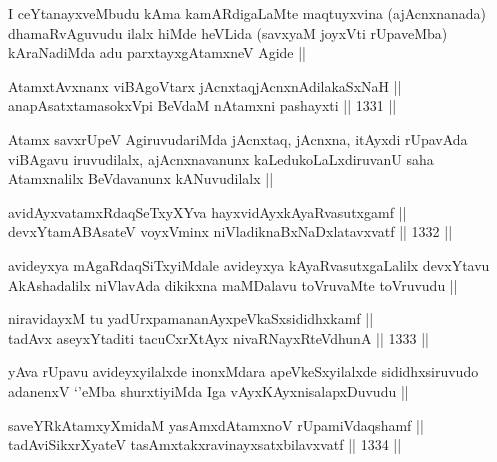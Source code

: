 \begin{artha}
I ceYtanayxveMbudu kAma kamARdigaLaMte maqtuyxvina (ajAcnxnanada) dhamaRvAguvudu ilalx hiMde heVLida (savxyaM joyxVti rUpaveMba) kAraNadiMda adu parxtayxgAtamxneV Agide ||
\end{artha}


\begin{shl}
AtamxtAvxnanx viBAgoV\s tarx jAcnxtaqjAcnxnAdilakaSxNaH ||  \\
anapAsatxtamasokxV\s pi BeVdaM nA\s \s tamxni pashayxti ||  1331 ||  
\end{shl}

\begin{artha}
Atamx savxrUpeV AgiruvudariMda jAcnxtaq, jAcnxna, itAyxdi rUpavAda viBAgavu iruvudilalx, ajAcnxnavanunx kaLedukoLaLxdiruvanU saha Atamxnalilx BeVdavanunx kANuvudilalx ||
\end{artha}


\begin{shl}
avidAyxvatamxRdaqSeTxyXYva hayxvidAyxkAyaRvasutxgamf ||  \\
devxYtamABAsateV voyxVminx niVladiknaBxNaDxlatavxvatf ||  1332 ||  
\end{shl}

\begin{artha}
avideyxya mAgaRdaqSiTxyiMdale avideyxya kAyaRvasutxgaLalilx devxYtavu AkAshadalilx niVlavAda dikikxna maMDalavu toVruvaMte toVruvudu ||
\end{artha}


\begin{shl}
niravidayxM tu yadUrxpamananAyxpeVkaSxsididhxkamf || \\
tadAvx aseyxYtaditi tacuCxrXtAyx nivaRNayxRteV\s dhunA ||  1333 ||  
\end{shl}

\begin{artha}
yAva rUpavu avideyxyilalxde inonxMdara apeVkeSxyilalxde sididhxsiruvudo adanenxV `\stext'eMba shurxtiyiMda Iga vAyxKAyxnisalapxDuvudu ||
\end{artha}

\begin{shl}
saveYRkAtamxyXmidaM yasAmxdAtamxnoV rUpamiVdaqshamf || \\
tadAviSikxrXyateV tasAmxtakxravinayxsatxbilavxvatf ||  1334 ||  
\end{shl}

